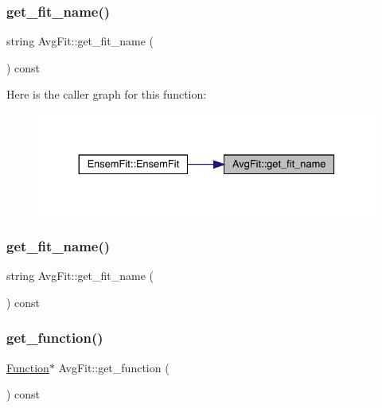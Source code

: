 \subsubsection{\texorpdfstring{get\_fit\_name()}{get\_fit\_name()}\hspace{0.1cm}{\footnotesize\ttfamily [1/2]}}
{\footnotesize\ttfamily string Avg\+Fit\+::get\+\_\+fit\+\_\+name (\begin{DoxyParamCaption}{ }\end{DoxyParamCaption}) const\hspace{0.3cm}{\ttfamily [inline]}}

Here is the caller graph for this function\+:
\nopagebreak
\begin{figure}[H]
\begin{center}
\leavevmode
\includegraphics[width=330pt]{d4/dfd/classAvgFit_af9fc84ffb95d3b08daa27ee377892537_icgraph}
\end{center}
\end{figure}
\mbox{\label{classAvgFit_af9fc84ffb95d3b08daa27ee377892537}} 
\subsubsection{\texorpdfstring{get\_fit\_name()}{get\_fit\_name()}\hspace{0.1cm}{\footnotesize\ttfamily [2/2]}}
{\footnotesize\ttfamily string Avg\+Fit\+::get\+\_\+fit\+\_\+name (\begin{DoxyParamCaption}{ }\end{DoxyParamCaption}) const\hspace{0.3cm}{\ttfamily [inline]}}

\mbox{\label{classAvgFit_a40e757ad0dc9563c684491165bee9baa}} 
\subsubsection{\texorpdfstring{get\_function()}{get\_function()}\hspace{0.1cm}{\footnotesize\ttfamily [1/2]}}
{\footnotesize\ttfamily \mbox{\hyperlink{classFunction}{Function}}$\ast$ Avg\+Fit\+::get\+\_\+function (\begin{DoxyParamCaption}{ }\end{DoxyParamCaption}) const\hspace{0.3cm}{\ttfamily [inline]}}

